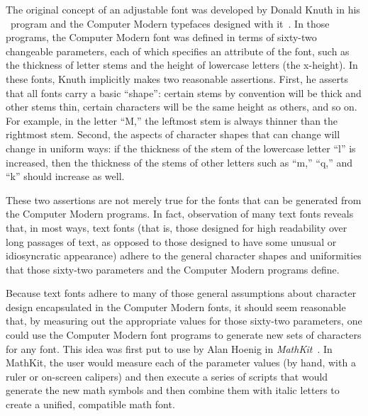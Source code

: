 
The original concept of an adjustable font was developed by Donald Knuth in his
\MF\ program and the Computer Modern typefaces designed with
it~\cite{mfbook,cte}. In those programs, the Computer Modern font was defined in
terms of sixty-two changeable parameters, each of which specifies an attribute
of the font, such as the thickness of letter stems and the height of lowercase
letters (the x-height). In these fonts, Knuth implicitly makes two reasonable
assertions. First, he asserts that all fonts carry a basic ``shape'': certain
stems by convention will be thick and other stems thin, certain characters will
be the same height as others, and so on. For example, in the letter ``M,'' the
leftmost stem is always thinner than the rightmost stem. Second, the aspects of
character shapes that can change will change in uniform ways: if the thickness
of the stem of the lowercase letter ``l'' is increased, then the thickness of
the stems of other letters such as ``m,'' ``q,'' and ``k'' should increase as
well. 

These two assertions are not merely true for the fonts that can be generated
from the Computer Modern programs. In fact, observation of many text fonts
reveals that, in most ways, text fonts (that is, those designed for high
readability over long passages of text, as opposed to those designed to have
some unusual or idiosyncratic appearance) adhere to the general character shapes
and uniformities that those sixty-two parameters and the Computer Modern
programs define.

Because text fonts adhere to many of those general assumptions about character
design encapsulated in the Computer Modern fonts, it should seem reasonable
that, by measuring out the appropriate values for those sixty-two parameters,
one could use the Computer Modern font programs to generate new sets of
characters for any font. This idea was first put to use by Alan Hoenig in
\emph{MathKit}~\cite{mathkit}. In MathKit, the user would measure each of the
parameter values (by hand, with a ruler or on-screen calipers) and then execute
a series of scripts that would generate the new math symbols and then combine
them with italic letters to create a unified, compatible math font.

